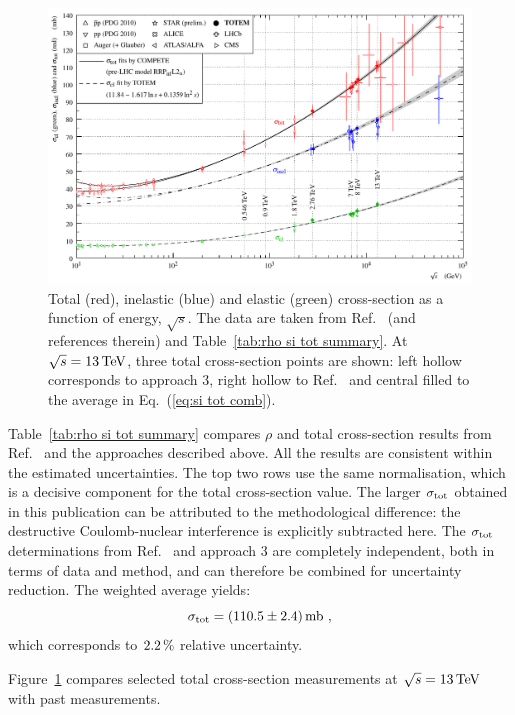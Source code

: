 \begin{figure}
\begin{center}
\includegraphics{fig/sigma_tot_el_inel_vs_s.pdf}
\caption{%
Total (red), inelastic (blue) and elastic (green) cross-section as a function of energy, $\sqrt s$. The data are taken from Ref.~\cite{totem-13tev-90m} (and references therein) and Table~\ref{tab:rho si tot summary}. At $\sqrt s = 13\,{\rm TeV}$, three total cross-section points are shown: left hollow corresponds to approach 3, right hollow to Ref.~\cite{totem-13tev-90m} and central filled to the average in Eq.~(\ref{eq:si tot comb}).
}
\label{fig:si tot inel el}
\end{center}
\end{figure}

Table~\ref{tab:rho si tot summary} compares $\rho$ and total cross-section results from Ref.~\cite{totem-13tev-90m} and the approaches described above. All the results are consistent within the estimated uncertainties. The top two rows use the same normalisation, which is a decisive component for the total cross-section value. The larger $\sigma_{\rm tot}$ obtained in this publication can be attributed to the methodological difference: the destructive Coulomb-nuclear interference is explicitly subtracted here. The $\sigma_{\rm tot}$ determinations from Ref.~\cite{totem-13tev-90m} and approach 3 are completely independent, both in terms of data and method, and can therefore be combined for uncertainty reduction. The weighted average yields:
\begin{equation}
\label{eq:si tot comb}
\sigma_{\rm tot} = (110.5 \pm 2.4)\,{\rm mb}\ ,
\end{equation}
which corresponds to $2.2\,{\rm \%}$ relative uncertainty.

Figure~\ref{fig:si tot inel el} compares selected total cross-section measurements at $\sqrt s = 13\,{\rm TeV}$ with past measurements.
